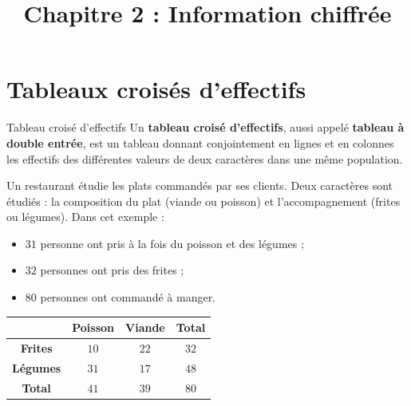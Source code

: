 \documentclass[11pt]{article}
\title{Chapitre 2 : Information chiffrée}
\date{}
\author{}
\begin{document}
\maketitle\thispagestyle{fancy}

%

\section{Tableaux croisés d'effectifs}
\begin{defi}{Tableau croisé d'effectifs}
  Un \textbf{tableau croisé d'effectifs}, aussi appelé \textbf{tableau à double
  entrée}, est un tableau donnant conjointement en lignes et en colonnes les
  effectifs des différentes valeurs de deux caractères dans une même population.
\end{defi}

\begin{exemple}
  \begin{minipage}{.5\textwidth}
  Un restaurant étudie les plats commandés par ses clients. Deux caractères sont
  étudiés : la composition du plat (viande ou poisson) et l'accompagnement
  (frites ou légumes). Dans cet exemple :
  \begin{itemize}
    \item $31$ personne ont pris à la fois du poisson et des légumes ;
    \item $32$ personnes ont pris des frites ;
    \item $80$ personnes ont commandé à manger.
  \end{itemize}
  \end{minipage}
  \begin{minipage}{.5\textwidth}
\begin{center}
\renewcommand{\arraystretch}{2}
\begin{tabular}{|c|c|c|c|}
  \cline{2-4}
  \multicolumn{1}{c|}{} & \textbf{Poisson} & \textbf{Viande} & \textbf{Total} \\
  \hline
  \textbf{Frites} & $10$ & $22$ & $32$ \\
  \hline
  \textbf{Légumes} & $31$ & $17$ & $48$ \\
  \hline
  \textbf{Total} & $41$ & $39$ & $80$ \\
  \hline
\end{tabular}
\end{center}
  \end{minipage}
\end{exemple}
\end{document}
